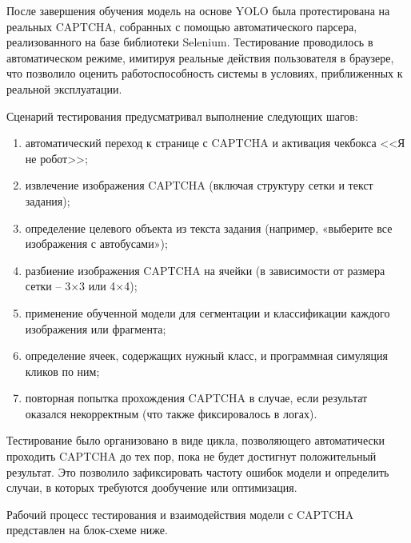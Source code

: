 После завершения обучения модель на основе YOLO была протестирована на реальных 
CAPTCHA, собранных с помощью автоматического парсера, реализованного на базе 
библиотеки Selenium. Тестирование проводилось в автоматическом режиме, имитируя 
реальные действия пользователя в браузере, что позволило оценить 
работоспособность системы в условиях, приближенных к реальной эксплуатации.

Сценарий тестирования предусматривал выполнение следующих шагов:
\begin{enumerate}
    \item автоматический переход к странице с CAPTCHA и активация чекбокса <<Я не 
    робот>>;
    \item извлечение изображения CAPTCHA (включая структуру сетки и текст 
    задания);
    \item определение целевого объекта из текста задания (например, «выберите все 
    изображения с автобусами»);
    \item разбиение изображения CAPTCHA на ячейки (в зависимости от размера сетки 
    -- 3×3 или 4×4);
    \item применение обученной модели для сегментации и классификации каждого 
    изображения или фрагмента;
    \item определение ячеек, содержащих нужный класс, и программная симуляция 
    кликов по ним;
    \item повторная попытка прохождения CAPTCHA в случае, если результат оказался 
    некорректным (что также фиксировалось в логах).
\end{enumerate}

Тестирование было организовано в виде цикла, позволяющего автоматически проходить 
CAPTCHA до тех пор, пока не будет достигнут положительный результат. Это 
позволило зафиксировать частоту ошибок модели и определить случаи, в которых 
требуются дообучение или оптимизация.

Рабочий процесс тестирования и взаимодействия модели с CAPTCHA представлен на 
блок-схеме ниже.

